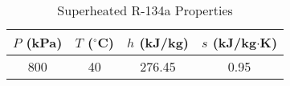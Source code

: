 \begin{table}[h!]
\centering
\caption*{Superheated R-134a Properties}
\begin{tabular}{|c|c|c|c|}
\hline
$P$ (kPa) & $T$ ($^\circ$C) & $h$ (kJ/kg) & $s$ (kJ/kg$\cdot$K) \\
\hline
800 & 40 & 276.45 & 0.95 \\
\hline
\end{tabular}
\end{table}
